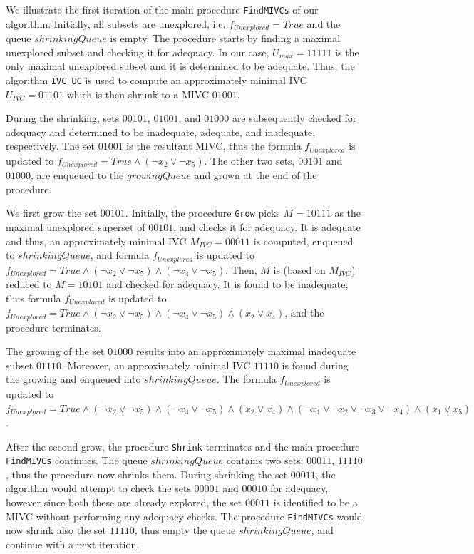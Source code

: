 We illustrate the first iteration of the main procedure \texttt{FindMIVCs} of our algorithm. Initially, all subsets are unexplored, i.e. $f_{\mathit{Unexplored}} = True$ and the queue $\mathit{shrinkingQueue}$ is empty. The procedure starts by finding a maximal unexplored subset and checking it for adequacy. In our case, $U_{\mathit{max}} = 11111$ is the only maximal unexplored subset and it is determined to be adequate. Thus, the algorithm \texttt{IVC\_UC} is used to compute an approximately minimal IVC $U_{\mathit{IVC}} = 01101$ which is then shrunk to a MIVC $01001$.

During the shrinking, sets $00101$, $01001$, and $01000$ are subsequently checked for adequacy and determined to be inadequate, adequate, and inadequate, respectively. The set $01001$ is the resultant MIVC, thus the formula $f_{\mathit{Unexplored}}$ is updated to $f_{\mathit{Unexplored}} = \mathit{True} \wedge (\neg x_2 \vee \neg x_5)$. The other two sets, $00101$ and $01000$, are enqueued to the $\mathit{growingQueue}$ and
grown at the end of the procedure.

We first grow the set $00101$. Initially, the procedure \texttt{Grow} picks $M = 10111$ as the maximal unexplored superset of $00101$, and checks it for adequacy. It is adequate and thus, an approximately minimal IVC $M_{\mathit{IVC}} = 00011$ is computed, enqueued to $\mathit{shrinkingQueue}$, and formula $f_{\mathit{Unexplored}}$ is updated to $f_{\mathit{Unexplored}} = \mathit{True} \wedge (\neg x_2 \vee \neg x_5) \wedge	(\neg x_4 \vee \neg x_5)$. Then, $M$ is (based on $M_{\mathit{IVC}}$) reduced to $M = 10101$ and checked for adequacy. It is found to be inadequate, thus formula $f_{\mathit{Unexplored}}$ is updated to $f_{\mathit{Unexplored}} = \mathit{True} \wedge (\neg x_2 \vee \neg x_5) \wedge	(\neg x_4 \vee \neg x_5) \wedge (x_2 \vee x_4)$, and the procedure terminates.

The growing of the set $01000$ results into an approximately maximal inadequate subset $01110$. Moreover, an approximately minimal IVC $11110$ is found during the growing and enqueued into $\mathit{shrinkingQueue}$. The formula $f_{\mathit{Unexplored}}$ is updated to $f_{\mathit{Unexplored}} = \mathit{True} \wedge (\neg x_2 \vee \neg x_5) \wedge	(\neg x_4 \vee \neg x_5) \wedge (x_2 \vee x_4) \wedge (\neg x_1 \vee \neg x_2 \vee \neg x_3 \vee \neg x_4) \wedge (x_1 \vee x_5)$.

After the second grow, the procedure \texttt{Shrink} terminates and the main procedure \texttt{FindMIVCs} continues. The queue $\mathit{shrinkingQueue}$ contains two sets: $00011$, $11110$, thus the procedure now shrinks them. During shrinking the set $00011$, the algorithm would attempt to check the sets $00001$ and $00010$ for adequacy, however since both these are already explored, the set $00011$ is identified to be a MIVC without performing any adequacy checks. The procedure \texttt{FindMIVCs} would now shrink also the set $11110$, thus empty the queue $\mathit{shrinkingQueue}$, and continue with a next iteration.
